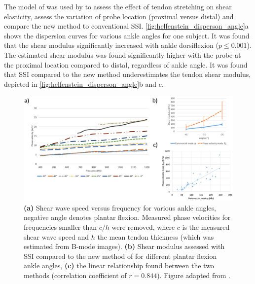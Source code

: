 The model of \citeauthor{brum_vivo_2014} was used by \citet{helfenstein-didier_vivo_2016} to assess the effect of tendon stretching on shear elasticity, assess the variation of probe location (proximal versus distal) and compare the new method to conventional SSI. \autoref{fig:helfenstein_disperson_angle}a shows the dispersion curves for various ankle angles for one subject. It was found that the shear modulus significantly increased with ankle dorsiflexion ($p\leq 0.001$). The estimated shear modulus was found significantly higher with the probe at the proximal location compared to distal, regardless of ankle angle. It was found that SSI compared to the new method underestimates the tendon shear modulus, depicted in \autoref{fig:helfenstein_disperson_angle}b and c. 


\begin{figure}[t]
	\centering
	\includegraphics[width=\linewidth]{Figures/elastography/helfenstein_dispersion_angle.png}
	\caption{\textbf{(a)} Shear wave speed versus frequency for various ankle angles, negative angle denotes plantar flexion. Measured phase velocities for frequencies smaller than $c/h$ were removed, where $c$ is the measured shear wave speed and $h$ the mean tendon thickness (which was estimated from B-mode images). \textbf{(b)} Shear modulus assessed with SSI compared to the new method of \cite{brum_vivo_2014} for different plantar flexion ankle angles, \textbf{(c)} the linear relationship found between the two methods (correlation coefficient of $r=0.844$). Figure adapted from \citet{helfenstein-didier_vivo_2016}.}
	\label{fig:helfenstein_disperson_angle}
\end{figure}

